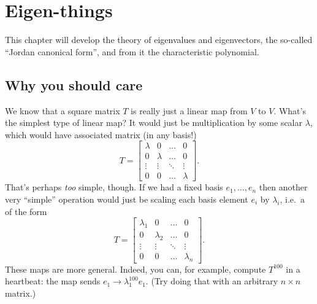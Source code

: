 \chapter{Eigen-things}
This chapter will develop the theory of eigenvalues and eigenvectors,
the so-called ``Jordan canonical form'',
and from it the characteristic polynomial.

\section{Why you should care}
We know that a square matrix $T$ is really just
a linear map from $V$ to $V$.
What's the simplest type of linear map?
It would just be multiplication by some scalar $\lambda$,
which would have associated matrix (in any basis!)
\[
	T =
	\begin{bmatrix}
		\lambda & 0 & \dots & 0 \\
		0 & \lambda & \dots & 0 \\
		\vdots & \vdots & \ddots & \vdots \\
		0 & 0 & \dots & \lambda
	\end{bmatrix}.
\]
That's perhaps \emph{too} simple, though.
If we had a fixed basis $e_1, \dots, e_n$
then another very ``simple'' operation
would just be scaling each basis element $e_i$ by $\lambda_i$,
i.e.\ a  of the form
\[
	T = \begin{bmatrix}
		\lambda_1 & 0 & \dots & 0 \\
		0 & \lambda_2 & \dots & 0 \\
		\vdots & \vdots & \ddots & \vdots \\
		0 & 0 & \dots & \lambda_n
	\end{bmatrix}.
\]
These maps are more general.
Indeed, you can, for example, compute $T^{100}$ in a heartbeat:
the map sends $e_1 \to \lambda_1^{100} e_1$.
(Try doing that with an arbitrary $n \times n$ matrix.)

